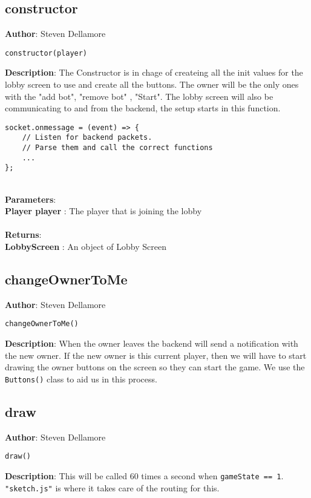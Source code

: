 \documentclass[12pt]{article}
\begin{document}
\subsection{constructor}
\textbf{Author}: Steven Dellamore 
\vspace*{1\baselineskip}
\begin{lstlisting}
constructor(player)
\end{lstlisting} 
\vspace*{1\baselineskip}
\textbf{Description}: The Constructor is in chage of createing all the init values for the lobby screen to use and create all the buttons. The owner will be the only ones with the "add bot", "remove bot" , "Start". The lobby screen will also be communicating to and from the backend, the setup starts in this function. 
\begin{verbatim}
socket.onmessage = (event) => {
    // Listen for backend packets.
    // Parse them and call the correct functions
    ...
};
\end{verbatim}
 


\textbf{\large{\\Parameters}}:\\
\textbf{Player player }: The player that is joining the lobby\\\textbf{\large{\\Returns}}:\\
\textbf{LobbyScreen }: An object of Lobby Screen\\

\subsection{changeOwnerToMe}
\textbf{Author}: Steven Dellamore 
\vspace*{1\baselineskip}
\begin{lstlisting}
changeOwnerToMe()
\end{lstlisting} 
\vspace*{1\baselineskip}
\textbf{Description}: When the owner leaves the backend will send a notification with the new owner. If the new owner is this current player, then we will have to start drawing the owner buttons on the screen so they can start the game. We use the \texttt{Buttons()} class to aid us in this process. 



\subsection{draw}
\textbf{Author}: Steven Dellamore 
\vspace*{1\baselineskip}
\begin{lstlisting}
draw()
\end{lstlisting} 
\vspace*{1\baselineskip}
\textbf{Description}: This will be called 60 times a second when \texttt{gameState == 1}. \texttt{"sketch.js"} is where it takes care of the routing for this. 
\end{document}
